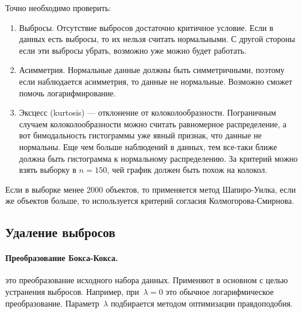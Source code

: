 \documentclass[../handbook.tex]{subfiles}
\begin{document}
Точно необходимо проверить:
\begin{enumerate}
    \item Выбросы. Отсутствие выбросов достаточно критичное условие. Если в данных есть выбросы, то их нельзя считать нормальными. С другой стороны если эти выбросы убрать, возможно уже можно будет работать.

    
    \item Асимметрия.\marginnote{ \[A = \frac{\mu_3}{\sigma^3}\]}
        Нормальные данные должны быть симметричными, поэтому если наблюдается асимметрия, то данные не нормальные. Возможно сможет помочь логарифмирование. 

    \item Эксцесс (kurtosis) --- отклонение от колоколообразности.
        \marginnote{ \[\gamma_2 = \frac{\mu_4}{\sigma^4} - 3\]}
        Пограничным случаем колоколообразности можно считать равномерное распределение, а вот бимодальность гистограммы уже явный признак, что данные не нормальны. Еще чем больше наблюдений в данных, тем все-таки ближе должна быть гистограмма к нормальному распределению. За критерий можно взять выборку в $n=150$, чей график должен быть похож на колокол.
\end{enumerate}

Если в выборке менее 2000 объектов, то применяется метод Шапиро-Уилка, если же объектов больше, то используется критерий согласия Колмогорова-Смирнова.

\subsection{Удаление выбросов}
\paragraph{Преобразование Бокса-Кокса.} 
это преобразование исходного набора
данных. Применяют в основном с целью устранения выбросов. Например,
при~$\lambda = 0$ это обычное логарифмическое преобразование.
Параметр~$\lambda$ подбирается методом оптимизации правдоподобия.
\end{document}
